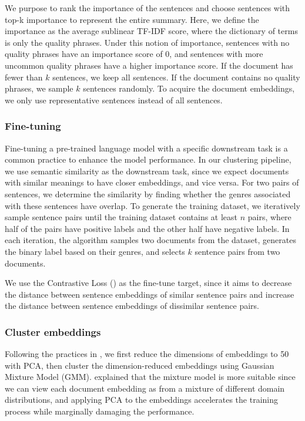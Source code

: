 \documentclass{article}
\begin{document}
\begin{multicols}{2}
We purpose to rank the importance of the sentences and choose sentences with top-k importance to represent the entire summary. Here, we define the importance as the average sublinear TF-IDF score, where the dictionary of terms is only the quality phrases. Under this notion of importance, sentences with no quality phrases have an importance score of 0, and sentences with more uncommon quality phrases have a higher importance score. If the document has fewer than $k$ sentences, we keep all sentences. If the document contains no quality phrases, we sample $k$ sentences randomly. To acquire the document embeddings, we only use representative sentences instead of all sentences.

\subsubsection{Fine-tuning}
Fine-tuning a pre-trained language model with a specific downstream task is a common practice to enhance the model performance. In our clustering pipeline, we use semantic similarity as the downstream task, since we expect documents with similar meanings to have closer embeddings, and vice versa. 
For two pairs of sentences, we determine the similarity by finding whether the genres associated with these sentences have overlap. To generate the training dataset, we iteratively sample sentence pairs until the training dataset contains at least $n$ pairs, where half of the pairs have positive labels and the other half have negative labels. In each iteration, the algorithm samples two documents from the dataset, generates the binary label based on their genres, and selects $k$ sentence pairs from two documents.

We use the Contrastive Loss (\cite{1640964}) as the fine-tune target, since it aims to decrease the distance between sentence embeddings of similar sentence pairs and increase the distance between sentence embeddings of dissimilar sentence pairs.


\subsubsection{Cluster embeddings}
Following the practices in \cite{aharoni-goldberg-2020-unsupervised}, we first reduce the dimensions of embeddings to 50 with PCA, then cluster the dimension-reduced embeddings using Gaussian Mixture Model (GMM). \cite{aharoni-goldberg-2020-unsupervised} explained that the mixture model is more suitable since we can view each document embedding as from a mixture of different domain distributions, and applying PCA to the embeddings accelerates the training process while marginally damaging the performance.




\end{multicols}
\end{document}

